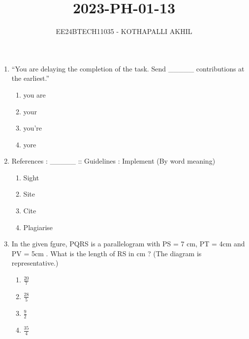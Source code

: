 \documentclass[article]{IEEEtran}
\numberwithin{figure}{enumi}
\begin{document}


\title{2023-PH-01-13}
\author{EE24BTECH11035 - KOTHAPALLI AKHIL}
{\let\newpage\relax\maketitle}

\usetikzlibrary{shapes.geometric}
\begin{enumerate}

\item ``You are delaying the completion of the task. Send \_\_\_\_\_ contributions at the earliest.''
  \begin{enumerate}
    \item you are
    \item your
    \item you're
    \item yore
  \end{enumerate}

\item References : \_\_\_\_\_ :: Guidelines : Implement (By word meaning)
  \begin{enumerate}
    \item Sight
    \item Site
    \item Cite
    \item Plagiarise
  \end{enumerate}
 \item In the given fgure, PQRS is a parallelogram with PS = 7 cm, PT = 4cm and PV = 5cm . What is the length of RS in cm ? (The diagram is representative.)
 \begin{enumerate}
     \item $\frac{20}{7}$
     \item $\frac{28}{5}$
     \item $\frac{9}{2}$
     \item $\frac{35}{4}$
 \end{enumerate}
 

\end{enumerate}
\end{document}
